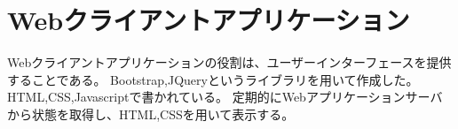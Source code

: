 \section{Webクライアントアプリケーション}
Webクライアントアプリケーションの役割は、ユーザーインターフェースを提供することである。
Bootstrap,JQueryというライブラリを用いて作成した。HTML,CSS,Javascriptで書かれている。
定期的にWebアプリケーションサーバから状態を取得し、HTML,CSSを用いて表示する。

